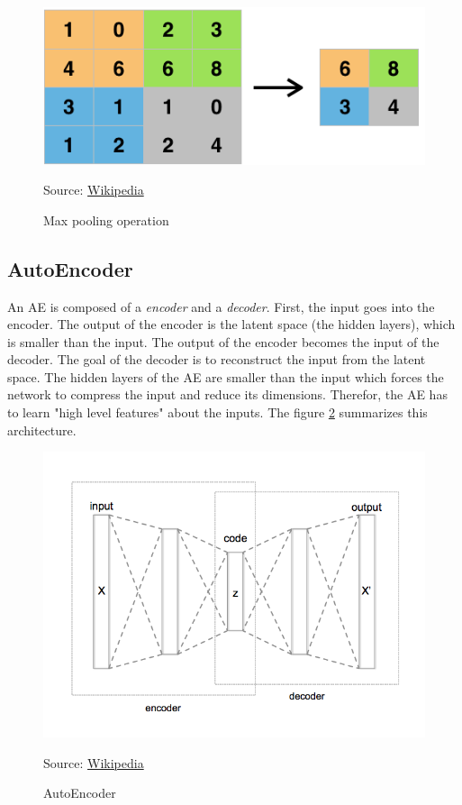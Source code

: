 \documentclass[12pt]{report}
\begin{document}
\begin{figure}[H]
    \centering
    \includegraphics[width=0.75 \textwidth]{images/nn/layers/max_pooling.png}
    \caption{Max pooling operation}
    Source: \href{https://en.wikipedia.org/wiki/File:Max_pooling.png}{Wikipedia}
    \label{fig:max_pooling}
\end{figure}

\subsection{AutoEncoder}
\label{sec:back:ae}

An AE \cite{moor_topological_2020, tschannen_recent_2018, rudolph_structuring_2019} is composed of a \textit{encoder} and a \textit{decoder}.
First, the input goes into the encoder.
The output of the encoder is the latent space (the hidden layers), which is smaller than the input.
The output of the encoder becomes the input of the decoder.
The goal of the decoder is to reconstruct the input from the latent space.
The hidden layers of the AE are smaller than the input which forces the network to compress the input and reduce its dimensions.
Therefor, the AE has to learn "high level features" about the inputs.
The figure \ref{fig:autoencoder} summarizes this architecture.

\begin{figure}[H]
    \centering
    \includegraphics[width=0.75 \textwidth]{images/nn/architectures/autoencoder.png}
    \caption{AutoEncoder}
    Source: \href{https://commons.wikimedia.org/wiki/File:Autoencoder_structure.png}{Wikipedia}
    \label{fig:autoencoder}
\end{figure}
\end{document}
